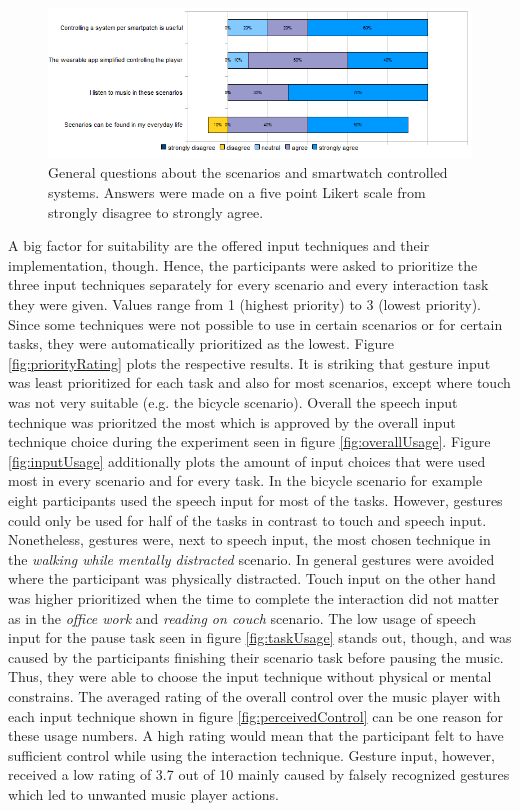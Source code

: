 \begin{figure}[h]
	\myfloatalign
	\includegraphics[width=1\linewidth]{img/generalQuestionsPlot.png}
	\caption{General questions about the scenarios and smartwatch controlled systems. Answers were made on a five point Likert scale from strongly disagree to strongly agree.}
	\label{fig:scenarioQuestions}
\end{figure}

\newpage

A big factor for suitability are the offered input techniques and their implementation, though. 
Hence, the participants were asked to prioritize the three input techniques separately for every scenario and every interaction task they were given. 
Values range from 1 (highest priority) to 3 (lowest priority). 
Since some techniques were not possible to use in certain scenarios or for certain tasks, they were automatically prioritized as the lowest. 
Figure \ref{fig:priorityRating} plots the respective results. 
It is striking that gesture input was least prioritized for each task and also for most scenarios, except where touch was not very suitable (e.g. the bicycle scenario). 
Overall the speech input technique was prioritzed the most which is approved by the overall input technique choice during the experiment seen in figure \ref{fig:overallUsage}. 
Figure \ref{fig:inputUsage} additionally plots the amount of input choices that were used most in every scenario and for every task. 
In the bicycle scenario for example eight participants used the speech input for most of the tasks. 
However, gestures could only be used for half of the tasks in contrast to touch and speech input. 
Nonetheless, gestures were, next to speech input, the most chosen technique in the \textit{walking while mentally distracted} scenario. 
In general gestures were avoided where the participant was physically distracted. 
Touch input on the other hand was higher prioritized when the time to complete the interaction did not matter as in the \textit{office work} and \textit{reading on couch} scenario. 
The low usage of speech input for the pause task seen in figure \ref{fig:taskUsage} stands out, though, and was caused by the participants finishing their scenario task before pausing the music. 
Thus, they were able to choose the input technique without physical or mental constrains. 
The averaged rating of the overall control over the music player with each input technique shown in figure \ref{fig:perceivedControl} can be one reason for these usage numbers. 
A high rating would mean that the participant felt to have sufficient control while using the interaction technique. 
Gesture input, however, received a low rating of 3.7 out of 10 mainly caused by falsely recognized gestures which led to unwanted music player actions.

